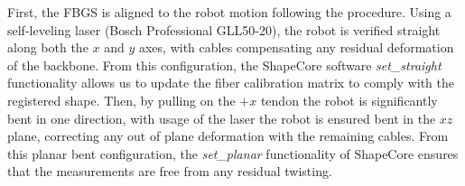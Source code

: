 \documentclass[14pt, a4paper]{article}
\begin{document}


First, the FBGS is aligned to the robot motion following the procedure.
Using a self-leveling laser (Bosch Professional GLL50-20), the robot is verified straight along both the $x$ and $y$ axes, with cables compensating any residual deformation of the backbone.
From this configuration, the ShapeCore software \textit{set\_straight} functionality allows us to update the fiber calibration matrix to comply with the registered shape.
Then, by pulling on the $+x$ tendon the robot is significantly bent in one direction, with usage of the laser the robot is ensured bent in the $xz$ plane, correcting any out of plane deformation with the remaining cables.
From this planar bent configuration, the \textit{set\_planar} functionality of ShapeCore ensures that the measurements are free from any residual twisting. 
\end{document}
